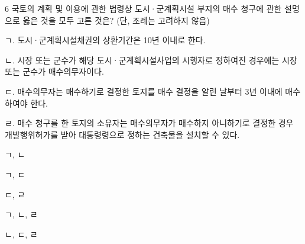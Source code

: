 \begin{question}{6}
국토의 계획 및 이용에 관한 법령상 도시·군계획시설 부지의 매수 청구에 관한 설명으로 옳은 것을 모두 고른 것은? (단, 조례는 고려하지 않음)
\begin{framedtext}
ㄱ. 도시·군계획시설채권의 상환기간은 10년 이내로 한다. \par
ㄴ. 시장 또는 군수가 해당 도시·군계획시설사업의 시행자로 정하여진 경우에는 시장 또는 군수가 매수의무자이다. \par
ㄷ. 매수의무자는 매수하기로 결정한 토지를 매수 결정을 알린 날부터 3년 이내에 매수하여야 한다. \par
ㄹ. 매수 청구를 한 토지의 소유자는 매수의무자가 매수하지 아니하기로 결정한 경우 개발행위허가를 받아 대통령령으로 정하는 건축물을 설치할 수 있다. \par
\end{framedtext}
\begin{choices}
  \item ㄱ, ㄴ
  \item ㄱ, ㄷ
  \item ㄷ, ㄹ
  \item ㄱ, ㄴ, ㄹ
  \item ㄴ, ㄷ, ㄹ
\end{choices}
\end{question}
